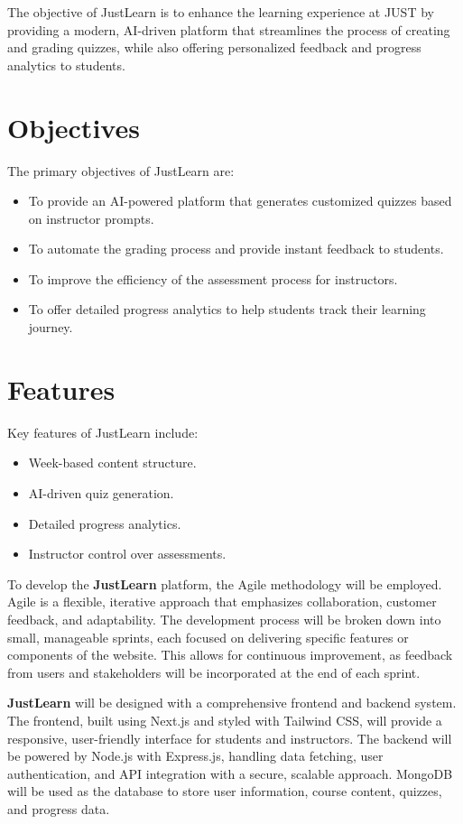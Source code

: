 \documentclass{thesis-library}
\begin{document}
The objective of JustLearn is to enhance the learning experience at JUST by providing a modern, AI-driven platform that streamlines the process of creating and grading quizzes, while also offering personalized feedback and progress analytics to students.

\section{Objectives}
The primary objectives of JustLearn are:
\begin{itemize}
\item To provide an AI-powered platform that generates customized quizzes based on instructor prompts.
\item To automate the grading process and provide instant feedback to students.
\item To improve the efficiency of the assessment process for instructors.
\item To offer detailed progress analytics to help students track their learning journey.
\end{itemize}

\section{Features}
Key features of JustLearn include:
\begin{itemize}
\item Week-based content structure.
\item AI-driven quiz generation.
\item Detailed progress analytics.
\item Instructor control over assessments.
\end{itemize}

To develop the \textbf{JustLearn} platform, the Agile methodology will be employed. Agile is a flexible, iterative approach that emphasizes collaboration, customer feedback, and adaptability. The development process will be broken down into small, manageable sprints, each focused on delivering specific features or components of the website. This allows for continuous improvement, as feedback from users and stakeholders will be incorporated at the end of each sprint.

\textbf{JustLearn} will be designed with a comprehensive frontend and backend system. The frontend, built using Next.js and styled with Tailwind CSS, will provide a responsive, user-friendly interface for students and instructors. The backend will be powered by Node.js with Express.js, handling data fetching, user authentication, and API integration with a secure, scalable approach. MongoDB will be used as the database to store user information, course content, quizzes, and progress data.
\end{document}
